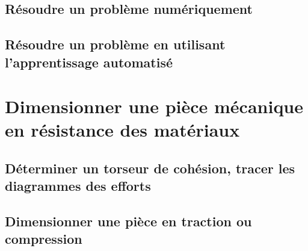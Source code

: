 \section{Résoudre un problème numériquement} 
\clearpage 
\newpage 
\section{Résoudre un problème en utilisant l'apprentissage automatisé} 
\clearpage 
\newpage 
\setchapterpreamble[u]{\margintoc} 
\chapter{Dimensionner une pièce mécanique en résistance des matériaux} 
\section{Déterminer un torseur de cohésion, tracer les diagrammes des efforts} 
\graphicspath{{\repStyle/png/}{../RDM/RDM-01-Cohesion/522_RdM/images/}} 
 
 
\graphicspath{{\repStyle/png/}{../RDM/RDM-01-Cohesion/523_RdM/images/}} 
 
 
\graphicspath{{\repStyle/png/}{../RDM/RDM-01-Cohesion/524_RdM/images/}} 
 
 
\graphicspath{{\repStyle/png/}{../RDM/RDM-01-Cohesion/525_RdM/images/}} 
 
 
\graphicspath{{\repStyle/png/}{../RDM/RDM-01-Cohesion/526_RdM/images/}} 
 
 
\graphicspath{{\repStyle/png/}{../RDM/RDM-01-Cohesion/527_RdM/images/}} 
 
 
\graphicspath{{\repStyle/png/}{../RDM/RDM-01-Cohesion/528_BrocheFraisage/images/}} 
 
 
\graphicspath{{\repStyle/png/}{../RDM/RDM-01-Cohesion/529_Passerelle/images/}} 
 
 
\graphicspath{{\repStyle/png/}{../RDM/RDM-01-Cohesion/530_BancHelico/images/}} 
 
 
\clearpage 
\newpage 
\section{Dimensionner une pièce en traction ou compression} 
\clearpage 
\newpage 
